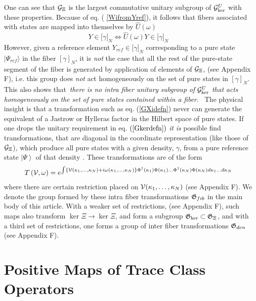 One can see that ${\cal G}_{\Xi }$ is the largest commutative unitary
subgroup of ${\cal G}_{\ker }^{U}$ with these properties. Because of eq. (%
\ref{WifromYref}), it follows that fibers associated with states are mapped
into themselves by $\hat{U}(\omega )$ 
\begin{equation}
Y\in \lbrack \gamma ]_{N}\Leftrightarrow \hat{U}(\omega )Y\in \lbrack \gamma
]_{N}
\end{equation}%
However, given a reference element $Y_{ref}\in \lbrack \gamma ]_{N}$
corresponding to a pure state $|\Psi _{ref}\rangle $ in the fiber $[\gamma
]_{N}$, it is {\em not} the case that all the rest of the pure-state segment
of the fiber is generated by application of elements of ${\cal G}_{\Xi }$,
(see Appendix F), i.e. this group does {\em not }act homogeneously on the
set of pure states in $[\gamma ]_{N}$. This also shows that{\em \ there is
no intra fiber unitary subgroup of }${\cal G}_{\ker }^{U}$ {\em that acts
homogeneously on the set of pure states contained within a fiber}.{\em \ }%
The physical insight is that a transformation such as eq. (\ref{GXidefn})
never can generate the equivalent of a Jastrow or Hylleras factor in the
Hilbert space of pure states. If one drops the unitary requirement in eq. $%
\left( \ref{Gkerdefn}\right) $ {\it it is} possible find transformations,
that are diagonal in the coordinate representation (like those of ${\cal G}%
_{\Xi }$){\it , }which produce all pure states with a given density, $\gamma 
$, from a pure reference state $\left| \Psi \right\rangle $ of that density%
{\it . }These transformations are of the form%
\begin{equation}
T\left( {\cal V},\omega \right) =e^{\int \left\{ {\cal V}(\kappa _{1},\ldots
,\kappa _{N})+i\omega (\kappa _{1},\ldots ,\kappa _{N})\right\} \Phi
^{\dagger }(\kappa _{1})\Phi (\kappa _{1})\ldots \Phi ^{\dagger }(\kappa
_{N})\Phi (\kappa _{N})d\kappa _{1}\ldots d\kappa _{N}}
\end{equation}%
where there are certain restriction placed on ${\cal V}(\kappa _{1},\ldots
,\kappa _{N})$ (see Appendix F). We denote the group formed by these intra
fiber transformations ${\frak G}_{fib}$ in the main body of this article.
With a weaker set of restrictions, (see Appendix F), such maps also
transform $\ker \Xi \rightarrow \ker \Xi $, and form a subgroup ${\frak G}%
_{\ker }\subset {\frak G}_{\Xi }$, and with a third set of restrictions, one
forms a group of inter fiber transformations ${\frak G}_{den}$ (see Appendix
F).

\section{Positive Maps of Trace Class Operators}


